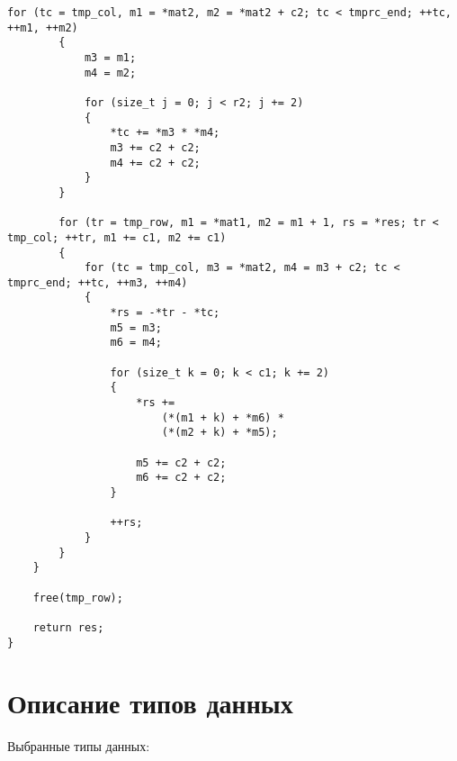 \begin{center}
\begin{lstlisting}[label=lst:vin_opt_mult, caption=Оптимизированный алгоритм Копперсмита--Винограда умножения матриц]
        for (tc = tmp_col, m1 = *mat2, m2 = *mat2 + c2; tc < tmprc_end; ++tc, ++m1, ++m2)
        {
            m3 = m1;
            m4 = m2;

            for (size_t j = 0; j < r2; j += 2)
            {
                *tc += *m3 * *m4;
                m3 += c2 + c2;
                m4 += c2 + c2;
            }
        }

        for (tr = tmp_row, m1 = *mat1, m2 = m1 + 1, rs = *res; tr < tmp_col; ++tr, m1 += c1, m2 += c1)
        {
            for (tc = tmp_col, m3 = *mat2, m4 = m3 + c2; tc < tmprc_end; ++tc, ++m3, ++m4)
            {
                *rs = -*tr - *tc;
                m5 = m3;
                m6 = m4;

                for (size_t k = 0; k < c1; k += 2)
                {
                    *rs += 
                        (*(m1 + k) + *m6) *
                        (*(m2 + k) + *m5);

                    m5 += c2 + c2;
                    m6 += c2 + c2;
                }

                ++rs;
            }
        }
    }

    free(tmp_row);

    return res;
}
	\end{lstlisting}
\end{center}

\section{Описание типов данных}

Выбранные типы данных:

